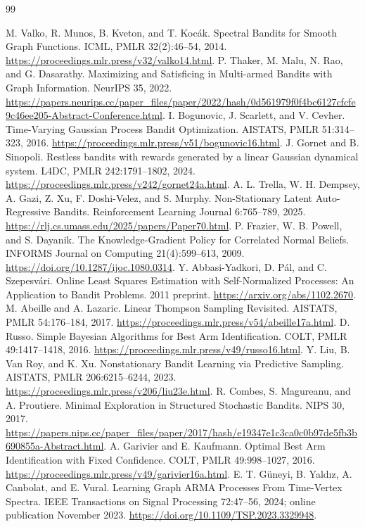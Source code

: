 \documentclass[11pt]{article}
\begin{document}
\begin{thebibliography}{99}
\raggedright
{} M. Valko, R. Munos, B. Kveton, and T. Koc\'{a}k. Spectral Bandits for Smooth Graph Functions. ICML, PMLR 32(2):46--54, 2014. \url{https://proceedings.mlr.press/v32/valko14.html}.
 P. Thaker, M. Malu, N. Rao, and G. Dasarathy. Maximizing and Satisficing in Multi-armed Bandits with Graph Information. NeurIPS 35, 2022. \url{https://papers.neurips.cc/paper_files/paper/2022/hash/0d561979f0f4bc6127cfcfe9c46ee205-Abstract-Conference.html}.
 I. Bogunovic, J. Scarlett, and V. Cevher. Time-Varying Gaussian Process Bandit Optimization. AISTATS, PMLR 51:314--323, 2016. \url{https://proceedings.mlr.press/v51/bogunovic16.html}.
 J. Gornet and B. Sinopoli. Restless bandits with rewards generated by a linear Gaussian dynamical system. L4DC, PMLR 242:1791--1802, 2024. \url{https://proceedings.mlr.press/v242/gornet24a.html}.
 A. L. Trella, W. H. Dempsey, A. Gazi, Z. Xu, F. Doshi-Velez, and S. Murphy. Non-Stationary Latent Auto-Regressive Bandits. Reinforcement Learning Journal 6:765--789, 2025. \url{https://rlj.cs.umass.edu/2025/papers/Paper70.html}.
 P. Frazier, W. B. Powell, and S. Dayanik. The Knowledge-Gradient Policy for Correlated Normal Beliefs. INFORMS Journal on Computing 21(4):599--613, 2009. \url{https://doi.org/10.1287/ijoc.1080.0314}.
 Y. Abbasi-Yadkori, D. P\'{a}l, and C. Szepesv\'{a}ri. Online Least Squares Estimation with Self-Normalized Processes: An Application to Bandit Problems. 2011 preprint. \url{https://arxiv.org/abs/1102.2670}.
 M. Abeille and A. Lazaric. Linear Thompson Sampling Revisited. AISTATS, PMLR 54:176--184, 2017. \url{https://proceedings.mlr.press/v54/abeille17a.html}.
 D. Russo. Simple Bayesian Algorithms for Best Arm Identification. COLT, PMLR 49:1417--1418, 2016. \url{https://proceedings.mlr.press/v49/russo16.html}.
 Y. Liu, B. Van Roy, and K. Xu. Nonstationary Bandit Learning via Predictive Sampling. AISTATS, PMLR 206:6215--6244, 2023. \url{https://proceedings.mlr.press/v206/liu23e.html}.
 R. Combes, S. Magureanu, and A. Proutiere. Minimal Exploration in Structured Stochastic Bandits. NIPS 30, 2017. \url{https://papers.nips.cc/paper_files/paper/2017/hash/e19347e1c3ca0c0b97de5fb3b690855a-Abstract.html}.
 A. Garivier and E. Kaufmann. Optimal Best Arm Identification with Fixed Confidence. COLT, PMLR 49:998--1027, 2016. \url{https://proceedings.mlr.press/v49/garivier16a.html}.
 E. T. G\"uneyi, B. Yald\i z, A. Canbolat, and E. Vural. Learning Graph ARMA Processes From Time-Vertex Spectra. IEEE Transactions on Signal Processing 72:47--56, 2024; online publication November 2023. \url{https://doi.org/10.1109/TSP.2023.3329948}.
\end{thebibliography}
\end{document}
